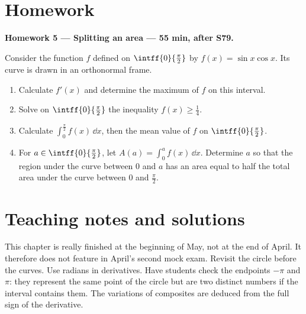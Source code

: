 \mxnewpage
\section{Homework}\textbf{Homework 5 --- Splitting an area --- 55 min, after S79.}\par Consider the function $f$ defined on $\intff{0}{\frac\pi2}$ by $f(x)=\sin x\cos x$. Its curve is drawn in an orthonormal frame.
\begin{enumerate}\item Calculate $f' (x)$ and determine the maximum of $f$ on this interval.
\item Solve on $\intff{0}{\frac\pi2}$ the inequality $f(x)\ge\frac14$.
\item Calculate $\displaystyle\int_0^{\frac{\pi}{2}}f(x)\,\dd x$, then the mean value of $f$ on $\intff{0}{\frac\pi2}$.
\item For $a\in\intff{0}{\frac\pi2}$, let $A(a)=\displaystyle\int_0^a f(x)\,\dd x$. Determine $a$ so that the region under the curve between $0$ and $a$ has an area equal to half the total area under the curve between $0$ and $\frac\pi2$.\end{enumerate}

\ifmxteacher\mxnewpage\section{Teaching notes and solutions}\begin{teachernote}This chapter is really finished at the beginning of May, not at the end of April. It therefore does not feature in April's second mock exam. Revisit the circle before the curves. Use radians in derivatives. Have students check the endpoints $-\pi$ and $\pi$: they represent the same point of the circle but are two distinct numbers if the interval contains them. The variations of composites are deduced from the full sign of the derivative.\end{teachernote}

